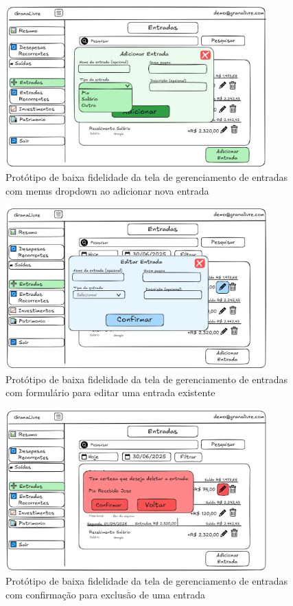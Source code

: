 \begin{figure}[H]
    \centering
    \includegraphics[width=0.9\textwidth]{imgs/06-entradas3.png}
    \caption{Protótipo de baixa fidelidade da tela de gerenciamento de entradas com menus dropdown ao adicionar nova entrada}
    \label{fig:prot_entradas3}
\end{figure}

\begin{figure}[H]
    \centering
    \includegraphics[width=0.9\textwidth]{imgs/06-entradas4.png}
    \caption{Protótipo de baixa fidelidade da tela de gerenciamento de entradas com formulário para editar uma entrada existente}
    \label{fig:prot_entradas4}
\end{figure}

\begin{figure}[H]
    \centering
    \includegraphics[width=0.9\textwidth]{imgs/06-entradas5.png}
    \caption{Protótipo de baixa fidelidade da tela de gerenciamento de entradas com confirmação para exclusão de uma entrada}
    \label{fig:prot_entradas5}
\end{figure}


